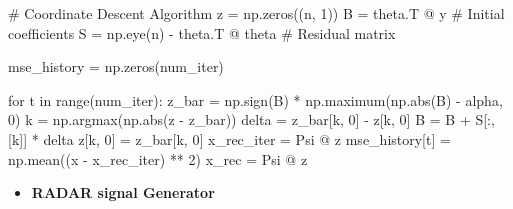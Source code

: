 \documentclass[
  letterpaper,
  DIV=11,
  numbers=noendperiod]{scrartcl}
\newenvironment{Shaded}{\begin{snugshade}}{\end{snugshade}}
\newcommand{\BuiltInTok}[1]{\textcolor[rgb]{0.40,0.85,0.94}{#1}}
\newcommand{\CommentTok}[1]{\textcolor[rgb]{0.46,0.44,0.37}{#1}}
\newcommand{\ControlFlowTok}[1]{\textcolor[rgb]{0.98,0.15,0.45}{#1}}
\newcommand{\DecValTok}[1]{\textcolor[rgb]{0.68,0.51,1.00}{#1}}
\newcommand{\KeywordTok}[1]{\textcolor[rgb]{0.98,0.15,0.45}{#1}}
\newcommand{\NormalTok}[1]{\textcolor[rgb]{0.97,0.97,0.95}{#1}}
\newcommand{\OperatorTok}[1]{\textcolor[rgb]{0.97,0.97,0.95}{#1}}
\providecommand{\tightlist}{%
  \setlength{\itemsep}{0pt}\setlength{\parskip}{0pt}}
\begin{document}
\begin{Shaded}
\begin{Highlighting}[]
\CommentTok{\# Coordinate Descent Algorithm}
\NormalTok{z }\OperatorTok{=}\NormalTok{ np.zeros((n, }\DecValTok{1}\NormalTok{))}
\NormalTok{B }\OperatorTok{=}\NormalTok{ theta.T }\OperatorTok{@}\NormalTok{ y  }\CommentTok{\# Initial coefficients}
\NormalTok{S }\OperatorTok{=}\NormalTok{ np.eye(n) }\OperatorTok{{-}}\NormalTok{ theta.T }\OperatorTok{@}\NormalTok{ theta  }\CommentTok{\# Residual matrix}

\NormalTok{mse\_history }\OperatorTok{=}\NormalTok{ np.zeros(num\_iter)}

\ControlFlowTok{for}\NormalTok{ t }\KeywordTok{in} \BuiltInTok{range}\NormalTok{(num\_iter):}
\NormalTok{    z\_bar }\OperatorTok{=}\NormalTok{ np.sign(B) }\OperatorTok{*}\NormalTok{ np.maximum(np.}\BuiltInTok{abs}\NormalTok{(B) }\OperatorTok{{-}}\NormalTok{ alpha, }\DecValTok{0}\NormalTok{)}
\NormalTok{    k }\OperatorTok{=}\NormalTok{ np.argmax(np.}\BuiltInTok{abs}\NormalTok{(z }\OperatorTok{{-}}\NormalTok{ z\_bar))}
\NormalTok{    delta }\OperatorTok{=}\NormalTok{ z\_bar[k, }\DecValTok{0}\NormalTok{] }\OperatorTok{{-}}\NormalTok{ z[k, }\DecValTok{0}\NormalTok{]}
\NormalTok{    B }\OperatorTok{=}\NormalTok{ B }\OperatorTok{+}\NormalTok{ S[:, [k]] }\OperatorTok{*}\NormalTok{ delta}
\NormalTok{    z[k, }\DecValTok{0}\NormalTok{] }\OperatorTok{=}\NormalTok{ z\_bar[k, }\DecValTok{0}\NormalTok{]}
\NormalTok{    x\_rec\_iter }\OperatorTok{=}\NormalTok{ Psi }\OperatorTok{@}\NormalTok{ z}
\NormalTok{    mse\_history[t] }\OperatorTok{=}\NormalTok{ np.mean((x }\OperatorTok{{-}}\NormalTok{ x\_rec\_iter) }\OperatorTok{**} \DecValTok{2}\NormalTok{)}
\NormalTok{x\_rec }\OperatorTok{=}\NormalTok{ Psi }\OperatorTok{@}\NormalTok{ z}
\end{Highlighting}
\end{Shaded}

\begin{itemize}
\tightlist
\item
  \textbf{RADAR signal Generator}
\end{itemize}
\end{document}
